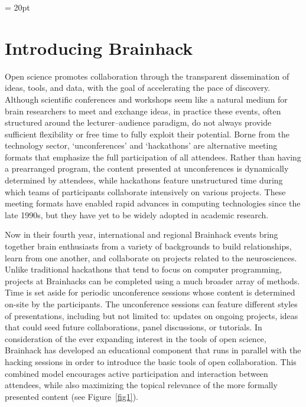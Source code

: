 \documentclass[11pt]{bmc_article_s50}
\begin{document}

\parindent = 20pt
\section*{Introducing Brainhack}

Open science promotes collaboration through the transparent dissemination of ideas, tools, and data, with the goal of accelerating the pace of discovery. Although scientific conferences and workshops seem like a natural medium for brain researchers to meet and exchange ideas, in practice these events, often structured around the lecturer--audience paradigm, do not always provide sufficient flexibility or free time to fully exploit their potential. Borne from the technology sector, `unconferences' and `hackathons' are alternative meeting formats that emphasize the full participation of all attendees. Rather than having a prearranged program, the content presented at unconferences is dynamically determined by attendees, while hackathons feature unstructured time during which teams of participants collaborate intensively on various projects. These meeting formats have enabled rapid advances in computing technologies since the late 1990s, but they have yet to be widely adopted in academic research. 


Now in their fourth year, international and regional Brainhack events bring together brain enthusiasts from a variety of backgrounds to build relationships, learn from one another, and collaborate on projects related to the neurosciences. Unlike traditional hackathons that tend to focus on computer programming, projects at Brainhacks can be completed using a much broader array of methods. Time is set aside for periodic unconference sessions whose content is determined on-site by the participants. The unconference sessions can feature different styles of presentations, including but not limited to: updates on ongoing projects, ideas that could seed future collaborations, panel discussions, or tutorials. In consideration of the ever expanding interest in the tools of open science, Brainhack has developed an educational component that runs in parallel with the hacking sessions in order to introduce the basic tools of open collaboration. This combined model encourages active participation and interaction between attendees, while also maximizing the topical relevance of the more formally presented content (see Figure~\ref{fig1}).
\end{document}
